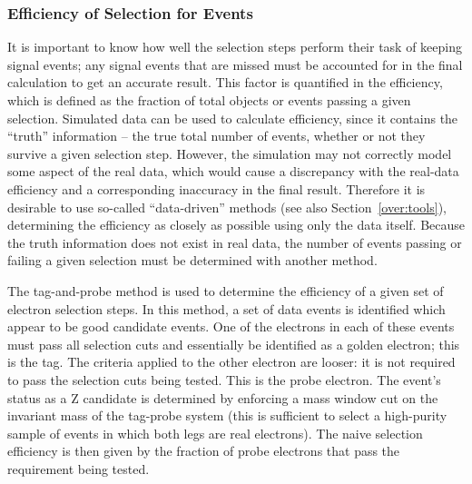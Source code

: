 
\subsubsection{Efficiency of Selection for \Zee Events}
\label{evSel:eff}

It is important to know how well the selection steps perform their task of 
keeping signal events;  
any signal events that are 
missed %
must be accounted for in the final 
calculation to get an accurate result.  
This factor is quantified in the efficiency, which is defined as 
the fraction of total objects or events passing a given selection. %
Simulated data can be used to calculate efficiency, 
since it contains the ``truth'' information -- 
the true total number of events, 
whether or not they survive a given selection step.
However, the simulation may not correctly model some 
aspect of the real data, which would cause a discrepancy 
with the real-data efficiency 
and a corresponding inaccuracy in the final result.  
Therefore it is desirable to use so-called ``data-driven''  
methods (see also Section~\ref{over:tools}), %
determining the efficiency as closely as possible 
using only the data itself.  
Because the truth information does not exist in real data, 
the number of events passing or failing a given selection 
must be determined with another method.  

The tag-and-probe method is used to determine the efficiency of a given set of electron selection steps.  
In this method, a set of data events is identified which appear to be good 
\Zee
candidate events.  
One of the electrons in each of these events must pass 
all selection cuts and essentially be identified as a golden electron; 
this is the tag.  
The criteria applied to the other electron are looser: 
it is not required to pass the selection cuts being tested.  
This is the probe electron.  
The event's status as a Z candidate is determined by enforcing 
a mass window cut on the invariant mass of the tag-probe system 
(this is sufficient %
to select a high-purity sample of 
events in which both legs are real electrons).
The naive selection efficiency is then given by the fraction 
of probe electrons that pass the requirement being tested.  

